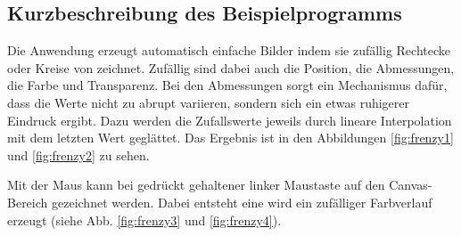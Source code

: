 \documentclass[a4paper, 12pt, hidelinks, listof=totoc, listoftables=totoc, bibliography=totoc]{scrreprt}
\begin{document}
\subsection{Kurzbeschreibung des Beispielprogramms}

Die Anwendung erzeugt automatisch einfache Bilder indem sie zufällig Rechtecke oder Kreise von zeichnet. Zufällig sind dabei auch die Position, die Abmessungen, die Farbe und Transparenz. Bei den Abmessungen sorgt ein Mechanismus dafür, dass die Werte nicht zu abrupt variieren, sondern sich ein etwas ruhigerer Eindruck ergibt. Dazu werden die Zufallswerte jeweils durch lineare Interpolation mit dem letzten Wert geglättet. Das Ergebnis ist in den Abbildungen \ref{fig:frenzy1} und \ref{fig:frenzy2} zu sehen.

Mit der Maus kann bei gedrückt gehaltener linker Maustaste auf den Canvas-Bereich gezeichnet werden. Dabei entsteht eine 
wird ein zufälliger Farbverlauf erzeugt (siehe Abb. \ref{fig:frenzy3} und \ref{fig:frenzy4}).
\end{document}
